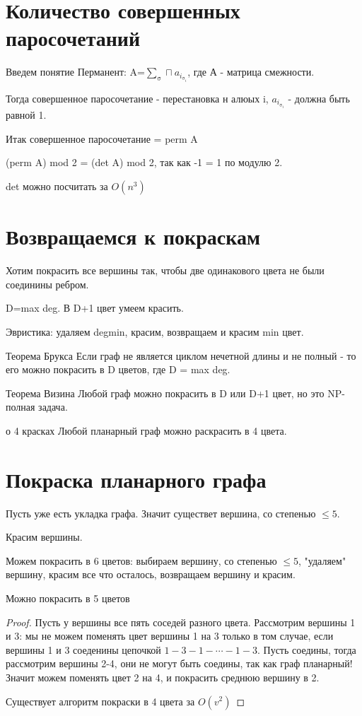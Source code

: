 \section{Количество совершенных паросочетаний}

Введем понятие Перманент: A=$\sum_{\upsigma}\sqcap a_{i_{\upsigma_{i}}}$, где А - матрица  смежности.

Тогда совершенное паросочетание - перестановка н алюых i, $a_{i_{\upsigma_{i}}}$ - должна быть равной 1.

Итак совершенное паросочетание = perm A

(perm A) mod 2 = (det A) mod 2, так как -1 = 1 по модулю 2.
\begin{Rem}
det можно посчитать за $O(n^3)$
\end{Rem}

\section{Возвращаемся к покраскам}
Хотим покрасить все вершины так, чтобы две одинакового цвета не были соединины ребром.

D=max deg. В D+1 цвет умеем красить.

Эвристика: удаляем degmin, красим, возвращаем и красим min цвет.

\begin{theorem}{Теорема Брукса}
Если граф не является циклом нечетной длины  и не полный - то его можно покрасить в D цветов, где D = max deg.
\end{theorem}

\begin{theorem}{Теорема Визина}
Любой граф можно покрасить в D или D+1 цвет, но это NP-полная задача.
\end{theorem}

\begin{theorem}{о 4 красках} 
Любой планарный граф можно раскрасить в 4 цвета.
\end{theorem}

\section{Покраска планарного графа}

Пусть уже есть укладка графа. Значит существет вершина, со степенью $\le 5$.

Красим вершины.

Можем покрасить в 6 цветов: выбираем вершину, со степенью $\le 5$, "удаляем" вершину, красим все что осталось, возвращаем вершину и красим.
\begin{theorem}{Можно покрасить в 5 цветов}
\end{theorem}
\begin{proof}
Пусть у вершины все пять соседей разного цвета. Рассмотрим вершины 1 и 3: мы не можем поменять цвет вершины 1 на 3 только в том случае, если вершины 1 и 3 соеденины цепочкой $1-3-1-\cdots-1-3$. Пусть соедины, тогда рассмотрим вершины 2-4, они не могут быть соедины, так как граф планарный! Значит можем поменять цвет 2 на 4, и покрасить среднюю вершину в 2.

Существует алгоритм покраски в 4 цвета за $O(v^2)$
\end{proof}

